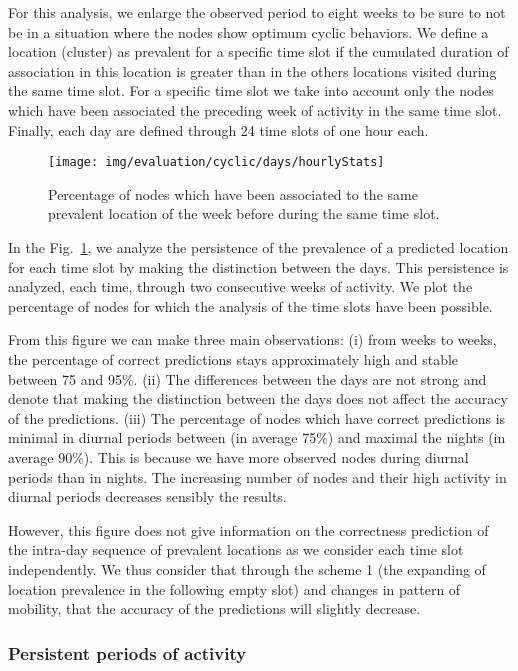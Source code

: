\documentclass[a4paper]{sig-alternate-10pt}
\begin{document}
For this analysis, we enlarge the observed period to eight weeks to
be sure to not be in a situation where the nodes show optimum
cyclic behaviors. We define a location (cluster) as prevalent for a
specific time slot if the cumulated duration of association in this
location is greater than in the others locations visited during the
same time slot. For a specific time slot we take into account only
the nodes which have been associated the preceding week of
activity in the same time slot. Finally, each day are defined
through 24 time slots of one hour each.

\begin{figure}
 \texttt{[image: img/evaluation/cyclic/days/hourlyStats]}
 \caption{Percentage of nodes which have been associated to the same
prevalent location of the week before during the same time slot.}
 \label{fig:average_days}
\end{figure}

In the Fig.~\ref{fig:average_days}, we analyze the persistence of
the prevalence of a predicted location for each time slot by making
the distinction between the days. This persistence is analyzed, each
time, through two consecutive weeks of activity. We plot the
percentage of nodes for which the analysis of the time slots
have been possible.

From this figure we can make three main observations: (i) from weeks
to weeks, the percentage of correct predictions stays approximately
high and stable between 75 and 95\%. (ii) The differences between
the days are not strong and denote that making the distinction
between the days does not affect the accuracy of the predictions.
(iii) The percentage of nodes which have correct predictions
is minimal in diurnal periods between (in average 75\%) and maximal
the nights (in average 90\%). This is because we have more observed
nodes during diurnal periods than in nights. The increasing
number of nodes and their high activity in diurnal periods
decreases sensibly the results.

However, this figure does not give information on the correctness
prediction of the intra-day sequence of prevalent locations as we
consider each time slot independently. We thus consider that through
the scheme 1 (the expanding of location prevalence in the following
empty slot) and changes in pattern of mobility, that the accuracy of
the predictions will slightly decrease.



\subsubsection{Persistent periods of activity}
\label{sssec:periods_activity}
\end{document}
